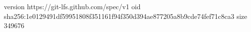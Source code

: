 version https://git-lfs.github.com/spec/v1
oid sha256:1e0129491df59951808f351161f94f350d394ae877205a8b9cde74fef71c8ca3
size 349676
